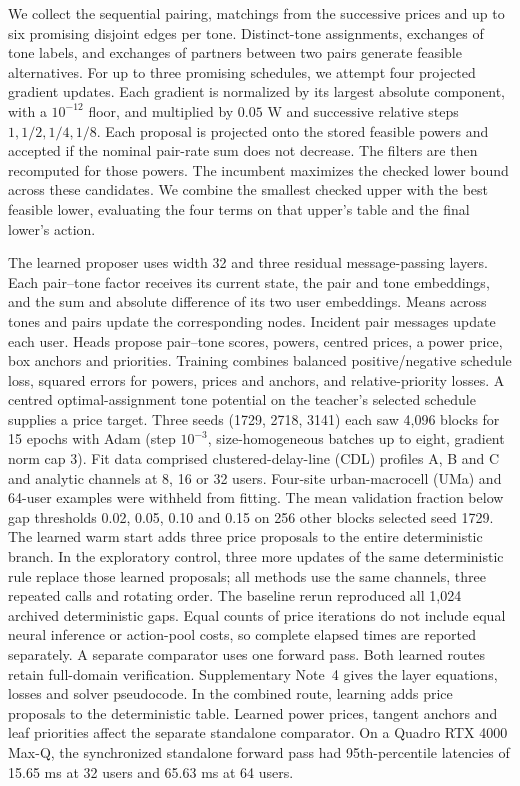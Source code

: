 \documentclass[lineno,pdflatex,sn-nature]{sn-jnl}
\begin{document}
We collect the sequential pairing, matchings from the successive prices and up to six promising disjoint edges per tone. Distinct-tone assignments, exchanges of tone labels, and exchanges of partners between two pairs generate feasible alternatives. For up to three promising schedules, we attempt four projected gradient updates. Each gradient is normalized by its largest absolute component, with a \(10^{-12}\) floor, and multiplied by \(0.05\) W and successive relative steps \(1,1/2,1/4,1/8\). Each proposal is projected onto the stored feasible powers and accepted if the nominal pair-rate sum does not decrease. The filters are then recomputed for those powers. The incumbent maximizes the checked lower bound across these candidates. We combine the smallest checked upper with the best feasible lower, evaluating the four terms on that upper's table and the final lower's action.

The learned proposer uses width 32 and three residual message-passing layers. Each pair--tone factor receives its current state, the pair and tone embeddings, and the sum and absolute difference of its two user embeddings. Means across tones and pairs update the corresponding nodes. Incident pair messages update each user. Heads propose pair--tone scores, powers, centred prices, a power price, box anchors and priorities. Training combines balanced positive/negative schedule loss, squared errors for powers, prices and anchors, and relative-priority losses. A centred optimal-assignment tone potential on the teacher's selected schedule supplies a price target. Three seeds (1729, 2718, 3141) each saw 4,096 blocks for 15 epochs with Adam (step \(10^{-3}\), size-homogeneous batches up to eight, gradient norm cap 3). Fit data comprised clustered-delay-line (CDL) profiles A, B and C and analytic channels at 8, 16 or 32 users. Four-site urban-macrocell (UMa) and 64-user examples were withheld from fitting. The mean validation fraction below gap thresholds 0.02, 0.05, 0.10 and 0.15 on 256 other blocks selected seed 1729. The learned warm start adds three price proposals to the entire deterministic branch. In the exploratory control, three more updates of the same deterministic rule replace those learned proposals; all methods use the same channels, three repeated calls and rotating order. The baseline rerun reproduced all 1,024 archived deterministic gaps. Equal counts of price iterations do not include equal neural inference or action-pool costs, so complete elapsed times are reported separately. A separate comparator uses one forward pass. Both learned routes retain full-domain verification. Supplementary Note~4 gives the layer equations, losses and solver pseudocode. In the combined route, learning adds price proposals to the deterministic table. Learned power prices, tangent anchors and leaf priorities affect the separate standalone comparator. On a Quadro RTX 4000 Max-Q, the synchronized standalone forward pass had 95th-percentile latencies of 15.65 ms at 32 users and 65.63 ms at 64 users.
\end{document}

